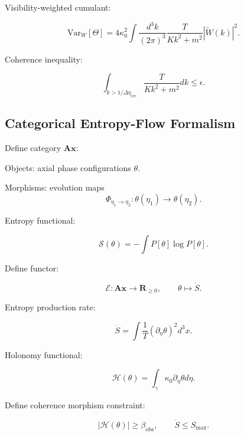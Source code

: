 \documentclass[12pt]{article}
\begin{document}
Visibility-weighted cumulant:

\begin{equation}
\mathrm{Var}_W[\Theta]
=
4\kappa_0^2
\int \frac{d^3k}{(2\pi)^3}
\frac{T}{Kk^2+m^2}
|\tilde{W}(k)|^2.
\end{equation}

Coherence inequality:

\begin{equation}
\int_{k > 1/\Delta\eta_{\mathrm{rec}}}
\frac{T}{Kk^2+m^2}
dk
\le
\epsilon.
\end{equation}

\subsection{Categorical Entropy-Flow Formalism}

Define category $\mathbf{Ax}$:

Objects: axial phase configurations $\theta$.

Morphisms: evolution maps
\begin{equation}
\Phi_{\eta_1\to\eta_2}:
\theta(\eta_1)\to\theta(\eta_2).
\end{equation}

Entropy functional:

\begin{equation}
\mathcal{S}(\theta)
=
- \int P[\theta]\log P[\theta].
\end{equation}

Define functor:

\begin{equation}
\mathcal{E}:
\mathbf{Ax}
\to
\mathbf{R}_{\ge 0},
\qquad
\theta \mapsto \dot{S}.
\end{equation}

Entropy production rate:

\begin{equation}
\dot{S}
=
\int
\frac{1}{T}
(\partial_\eta \theta)^2 d^3x.
\end{equation}

Holonomy functional:

\begin{equation}
\mathcal{H}(\theta)
=
\int_\gamma \kappa_0 \partial_\eta \theta d\eta.
\end{equation}

Define coherence morphism constraint:

\begin{equation}
|\mathcal{H}(\theta)|
\ge
\beta_{\mathrm{obs}},
\qquad
\dot{S}
\le
S_{\mathrm{max}}.
\end{equation}
\end{document}
